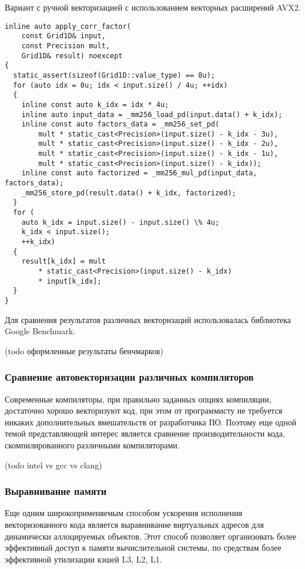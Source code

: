 Вариант с ручной векторизацией с использованием векторных расширений AVX2.

\begin{lstlisting}[style={CppCodeStyle}]
inline auto apply_corr_factor(
	const Grid1D& input,
	const Precision mult,
	Grid1D& result) noexcept
{
  static_assert(sizeof(Grid1D::value_type) == 8u);
  for (auto idx = 0u; idx < input.size() / 4u; ++idx)
  {
    inline const auto k_idx = idx * 4u;
    inline auto input_data = _mm256_load_pd(input.data() + k_idx);
    inline const auto factors_data = _mm256_set_pd(
        mult * static_cast<Precision>(input.size() - k_idx - 3u),
        mult * static_cast<Precision>(input.size() - k_idx - 2u),
        mult * static_cast<Precision>(input.size() - k_idx - 1u),
        mult * static_cast<Precision>(input.size() - k_idx));
    inline const auto factorized = _mm256_mul_pd(input_data, factors_data);
    _mm256_store_pd(result.data() + k_idx, factorized);
  }
  for (
  	auto k_idx = input.size() - input.size() \% 4u;
  	k_idx < input.size();
  	++k_idx) 
  {
    result[k_idx] = mult
    	* static_cast<Precision>(input.size() - k_idx)
    	* input[k_idx];
  }
}
\end{lstlisting}

Для сравнения результатов различных векторизаций использовалась библиотека Google Benchmark.

(todo оформленные результаты бенчмарков)

\subsubsection{Сравнение автовекторизации различных компиляторов}

Современные компиляторы, при правильно заданных опциях компиляции, достаточно хорошо векторизуют код,
при этом от программисту не требуется никаких дополнительных вмешательств от разработчика ПО.
Поэтому еще одной темой представляющей интерес является сравнение производительности кода,
скомпилированного различными компиляторами.

(todo intel vs gcc vs clang)

\subsubsection{Выравнивание памяти}

Еще одним широкоприменяемым способом ускорения исполнения векторизованного кода является выравнивание виртуальных адресов
для динамически аллоцируемых объектов. Этот способ позволяет организовать более эффективный доступ к памяти вычислительной системы,
по средствам более эффективной утилизации кэшей L3, L2, L1.

